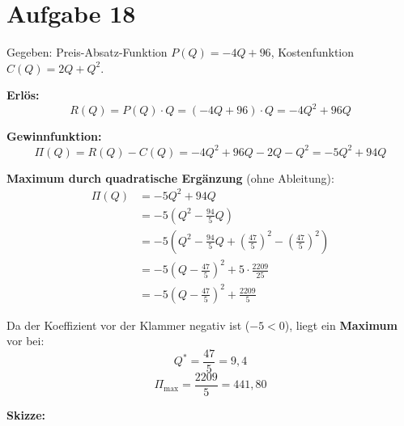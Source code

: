 \documentclass[12pt]{article}
\begin{document}
\section*{Aufgabe 18}

Gegeben: Preis-Absatz-Funktion $P(Q) = -4Q + 96$, Kostenfunktion $C(Q) = 2Q + Q^2$.

\textbf{Erl\"os:}
\[
  R(Q) = P(Q) \cdot Q = (-4Q + 96) \cdot Q = -4Q^2 + 96Q
\]

\textbf{Gewinnfunktion:}
\[
  \Pi(Q) = R(Q) - C(Q) = -4Q^2 + 96Q - 2Q - Q^2 = -5Q^2 + 94Q
\]

\textbf{Maximum durch quadratische Erg\"anzung} (ohne Ableitung):
\begin{align*}
  \Pi(Q) &= -5Q^2 + 94Q \\
         &= -5\!\left(Q^2 - \frac{94}{5}Q\right) \\
         &= -5\!\left(Q^2 - \frac{94}{5}Q + \left(\frac{47}{5}\right)^{\!2} - \left(\frac{47}{5}\right)^{\!2}\right) \\
         &= -5\!\left(Q - \frac{47}{5}\right)^{\!2} + 5 \cdot \frac{2209}{25} \\
         &= -5\!\left(Q - \frac{47}{5}\right)^{\!2} + \frac{2209}{5}
\end{align*}

Da der Koeffizient vor der Klammer negativ ist ($-5 < 0$), liegt ein \textbf{Maximum} vor bei:
\[
  \boxed{Q^* = \frac{47}{5} = 9{,}4}
\]
\[
  \boxed{\Pi_{\max} = \frac{2209}{5} = 441{,}80}
\]

\textbf{Skizze:}

\begin{center}
\end{center}


\end{document}
